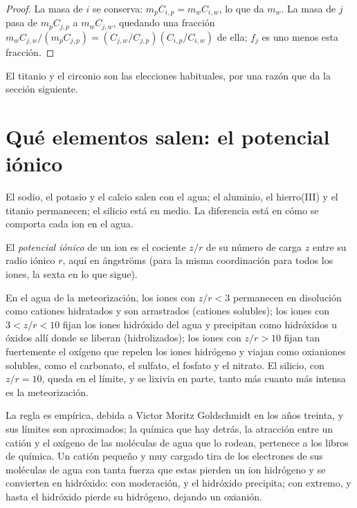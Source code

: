 \begin{proof}
La masa de $i$ se conserva: $m_p C_{i,p} = m_w C_{i,w}$, lo que da $m_w$.
La masa de $j$ pasa de $m_p C_{j,p}$ a $m_w C_{j,w}$, quedando una fracción
$m_w C_{j,w}/(m_p C_{j,p}) = (C_{j,w}/C_{j,p})(C_{i,p}/C_{i,w})$ de ella; $f_j$ es uno menos esta fracción.
\end{proof}

El titanio y el circonio son las elecciones habituales, por una razón que da la sección siguiente.

\section{Qué elementos salen: el potencial iónico}\label{sec:b1:weathering-clays:ionic}

El sodio, el potasio y el calcio salen con el agua; el aluminio, el hierro(III) y el titanio permanecen; el silicio está en medio. La diferencia
está en cómo se comporta cada ion en el agua.

\begin{definition}\label{def:b1:weathering-clays:ionic-potential}
El \emph{potencial iónico} de un ion es el cociente $z/r$
de su número de carga $z$ entre su radio iónico $r$, aquí en ångströms (para la misma coordinación para todos los iones, la sexta en lo que sigue).
\end{definition}

\begin{proposition}\label{prop:b1:weathering-clays:fields}
En el agua de la meteorización, los iones con $z/r < 3$ permanecen en disolución como cationes hidratados y son arrastrados (cationes solubles);
los iones con $3 < z/r < 10$ fijan los iones hidróxido del agua y precipitan como hidróxidos u óxidos allí donde se liberan (hidrolizados);
los iones con $z/r > 10$ fijan tan fuertemente el oxígeno que repelen los iones hidrógeno y viajan como oxianiones solubles, como el carbonato,
el sulfato, el fosfato y el nitrato. El silicio, con $z/r = 10$, queda en el límite, y se lixivia en parte, tanto más cuanto más intensa es la meteorización.
\end{proposition}
\admitted

La regla es empírica, debida a Victor Moritz Goldschmidt en los años treinta, y sus límites son aproximados; la química que hay detrás, la atracción
entre un catión y el oxígeno de las moléculas de agua que lo rodean, pertenece a los libros de química. Un catión pequeño y muy cargado tira de los
electrones de sus moléculas de agua con tanta fuerza que estas pierden un ion hidrógeno y se convierten en hidróxido: con moderación, y el hidróxido
precipita; con extremo, y hasta el hidróxido pierde su hidrógeno, dejando un oxianión.


